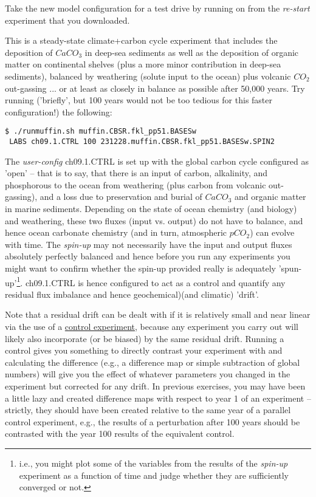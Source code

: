 \newpage

\noindent Take the new model configuration for a test drive by running on from the \textit{re-start} experiment that you downloaded.

This is a steady-state climate+carbon cycle experiment that includes the deposition of \(CaCO_{3}\) in deep-sea sediments as well as the deposition of organic matter on continental shelves (plus a more minor contribution in deep-sea sediments), balanced by weathering (solute input to the ocean) plus volcanic \(CO_{2}\) out-gassing ... or at least as closely in balance as possible after 50,000 years. Try running ('briefly', but 100 years would not be too tedious for this faster configuration!) the following:

\vspace{-2mm}\small\begin{verbatim}
$ ./runmuffin.sh muffin.CBSR.fkl_pp51.BASESw
 LABS ch09.1.CTRL 100 231228.muffin.CBSR.fkl_pp51.BASESw.SPIN2
\end{verbatim}\normalsize\vspace{-2mm}

The \textit{user-config} \textsf{\footnotesize ch09.1.CTRL} is set up with the global carbon cycle configured as 'open' -- that is to say, that there is an input of carbon, alkalinity, and phosphorous to the ocean from weathering (plus carbon from volcanic out-gassing), and a loss due to preservation and burial of \(CaCO_{3}\) and organic matter in marine sediments. Depending on the state of ocean chemistry (and biology) and weathering, these two fluxes (input vs. output) do not have to balance, and hence ocean carbonate chemistry (and in turn, atmospheric \(pCO_{2}\)) can evolve with time. The \textit{spin-up} may not necessarily have the input and output fluxes absolutely perfectly balanced and hence before you run any experiments you might want to confirm whether the spin-up provided really is adequately 'spun-up'\footnote{i.e., you might plot some of the variables from the results of the \textit{spin-up}  experiment as a function of time and judge whether they are sufficiently converged or not.}. \textsf{\footnotesize ch09.1.CTRL} is hence configured to act as a control and quantify any residual flux imbalance and hence geochemical)(and climatic) 'drift'.

Note that a residual drift can be dealt with if it is relatively small and near linear via the use of a \uline{control experiment}, because any experiment you carry out will likely also incorporate (or be biased) by the same residual drift. Running a control gives you something to directly contrast  your experiment with and calculating the difference (e.g., a difference map or simple subtraction of global numbers) will give you the effect of whatever parameters you changed in the experiment but corrected for any drift. In previous exercises, you may have been a little lazy and created difference maps with respect to year 1 of an experiment -- strictly, they should have been created relative to the same year of a parallel control experiment, e.g., the results of a perturbation after 100 years should be contrasted with the year 100 results of the equivalent control.

